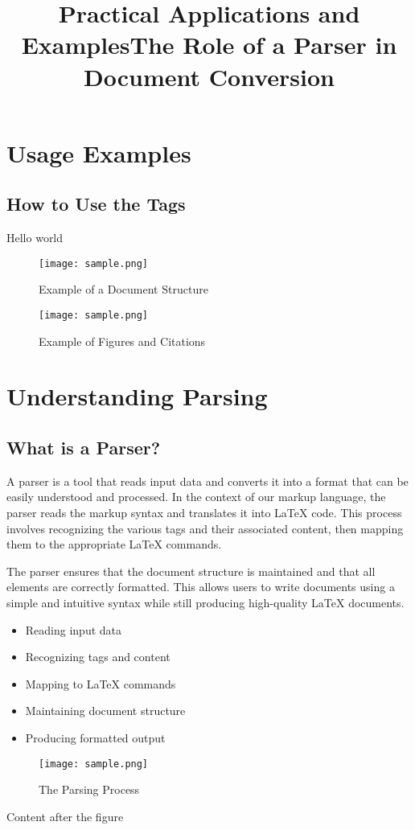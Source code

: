 \documentclass[oneside]{book}
\begin{document}
\newpage
\chapter{Usage Examples}
\section{How to Use the Tags}
\title{Practical Applications and Examples}
Hello world\par
\begin{figure}[h]
\centering
\texttt{[image: sample.png]}
\caption{Example of a Document Structure}
\texttt{[image: sample.png]}
\caption{Example of Figures and Citations}
\end{figure}
\newpage
\chapter{Understanding Parsing}
\section{What is a Parser?}
\title{The Role of a Parser in Document Conversion}
A parser is a tool that reads input data and converts it into a format that can be easily understood and processed. In the context of our markup language, the parser reads the markup syntax and translates it into LaTeX code. This process involves recognizing the various tags and their associated content, then mapping them to the appropriate LaTeX commands.\par
The parser ensures that the document structure is maintained and that all elements are correctly formatted. This allows users to write documents using a simple and intuitive syntax while still producing high-quality LaTeX documents.\par
\begin{itemize}
\item Reading input data
\item Recognizing tags and content
\item Mapping to LaTeX commands
\item Maintaining document structure
\item Producing formatted output
\end{itemize}
\begin{figure}[h]
\centering
\texttt{[image: sample.png]}
\caption{The Parsing Process}
\end{figure}Content after the figure\par
\end{document}
